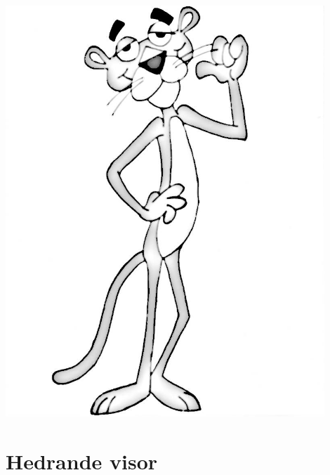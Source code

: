 \documentclass{article}
\begin{document}
\newpage
\null
\newpage
\thispagestyle{empty}
\null
\vfill
\begin{center}
   
   \includegraphics[width=0.9\textwidth]{res/hyllningsvisor.jpg}
   \section{Hedrande visor}
   
\end{center}
\vfill
\newpage
\end{document}

